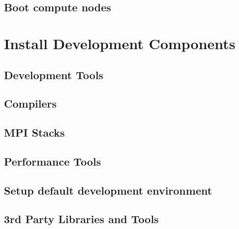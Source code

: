 \documentclass[letterpaper]{article}
\begin{document}
\clearpage
\subsection{Boot compute nodes} \label{sec:boot_computes}


\section{Install \OHPC{} Development Components}


\subsection{Development Tools} \label{sec:install_dev_tools}


\vspace*{-0.15cm}
\subsection{Compilers} \label{sec:install_compilers}


\subsection{MPI Stacks} \label{sec:mpi}


\subsection{Performance Tools} \label{sec:install_perf_tools}


\subsection{Setup default development environment}


\vspace*{0.3cm}
\subsection{3rd Party Libraries and Tools} \label{sec:3rdparty}



\vspace*{0.1cm}

\vspace*{0.5cm}
\end{document}
